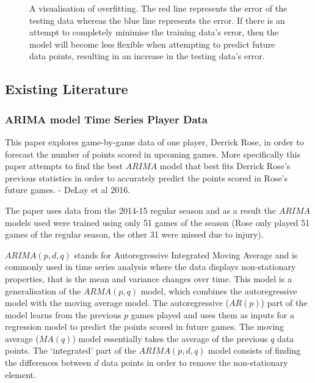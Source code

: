 \documentclass[a4paper,11pt,twoside]{article}
\begin{document}
      \begin{figure}[!htb]
      \captionsetup{justification=centering}
        \caption{\label{fig:my-label} A visualisation of overfitting. The red line represents the error of the testing data whereas the blue line represents the error. If there is an attempt to completely minimise the training data's error, then the model will become less flexible when attempting to predict future data points, resulting in an increase in the testing data's error. }
      \end{figure}




\subsection{Existing Literature}
 
\subsubsection{ARIMA model Time Series Player Data}

This paper explores game-by-game data of one player, Derrick Rose, in order to forecast the number of points scored in upcoming games. More specifically this paper attempts to find the best $ARIMA$ model that best fits Derrick Rose's previous statistics in order to accurately predict the points scored in Rose's future games. - DeLay et al 2016.

The paper uses data from the 2014-15 regular season and as a result the $ARIMA$ models used  were trained using only 51 games of the season (Rose only played 51 games of the regular season, the other 31 were missed due to injury).

$ARIMA(p,d,q)$ stands for Autoregressive Integrated Moving Average and is commonly used in time series analysis where the data displays non-stationary properties, that is the mean and variance changes over time. This model is a generalisation of the $ARMA(p,q)$ model, which combines the autoregressive model with the moving average model. The autoregressive ($AR(p)$) part of the model learns from the previous $p$ games played and uses them as inputs for a regression model to predict the points scored in future games. The moving average ($MA(q)$) model essentially takes the average of the previous $q$ data points. The `integrated' part of the $ARIMA(p,d,q)$ model consists of finding the differences between $d$ data points in order to remove the non-stationary element.
\end{document}
